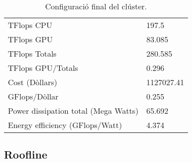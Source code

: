 \begin{table}[H]
\begin{adjustwidth}{-1.0in}{-1.0in}
\begin{center}
\begin{tabular}{l|l}
{\cellcolor[HTML]{EFEFEF}TFlops CPU}                & {\cellcolor[HTML]{EFEFEF}197.5}                    \\
{\color[HTML]{000000}TFlops GPU}                & {\color[HTML]{000000}83.085}                    \\ 
{\cellcolor[HTML]{EFEFEF}TFlops Totals}             & {\cellcolor[HTML]{EFEFEF}280.585}                   \\ 
{\color[HTML]{000000}TFlops GPU/Totals}         & {\color[HTML]{000000} 0.296}                    \\ 
{\cellcolor[HTML]{EFEFEF}Cost (Dòllars)}                 & {\cellcolor[HTML]{EFEFEF}1127027.41}              \\
{\color[HTML]{000000}GFlops/Dòllar}               & {\color[HTML]{000000}0.255}                    \\
    \rowcolor[HTML]{EFEFEF}
Power dissipation total (Mega Watts) & 65.692 \\
    Energy efficiency (GFlops/Watt) & 4.374 \\ \hline
\end{tabular}
\caption{Configuració final del clúster.}
\end{center}
\end{adjustwidth}
\end{table}




\subsection{Roofline}


